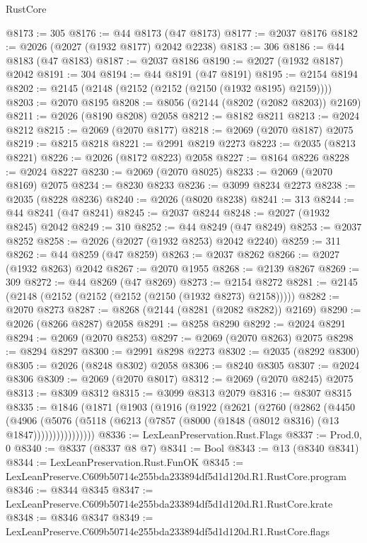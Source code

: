 \begin{lexlean}{RustCore}
\begin{coremodule}
@8173 := 305
@8176 := @44 @8173 (@47 @8173)
@8177 := @2037 @8176
@8182 := @2026 (@2027 (@1932 @8177) @2042 @2238)
@8183 := 306
@8186 := @44 @8183 (@47 @8183)
@8187 := @2037 @8186
@8190 := @2027 (@1932 @8187) @2042
@8191 := 304
@8194 := @44 @8191 (@47 @8191)
@8195 := @2154 @8194
@8202 := @2145 (@2148 (@2152 (@2152 (@2150 (@1932 @8195) @2159))))
@8203 := @2070 @8195
@8208 := @8056 (@2144 (@8202 (@2082 @8203)) @2169)
@8211 := @2026 (@8190 @8208) @2058
@8212 := @8182 @8211
@8213 := @2024 @8212
@8215 := @2069 (@2070 @8177)
@8218 := @2069 (@2070 @8187) @2075
@8219 := @8215 @8218
@8221 := @2991 @8219 @2273
@8223 := @2035 (@8213 @8221)
@8226 := @2026 (@8172 @8223) @2058
@8227 := @8164 @8226
@8228 := @2024 @8227
@8230 := @2069 (@2070 @8025)
@8233 := @2069 (@2070 @8169) @2075
@8234 := @8230 @8233
@8236 := @3099 @8234 @2273
@8238 := @2035 (@8228 @8236)
@8240 := @2026 (@8020 @8238)
@8241 := 313
@8244 := @44 @8241 (@47 @8241)
@8245 := @2037 @8244
@8248 := @2027 (@1932 @8245) @2042
@8249 := 310
@8252 := @44 @8249 (@47 @8249)
@8253 := @2037 @8252
@8258 := @2026 (@2027 (@1932 @8253) @2042 @2240)
@8259 := 311
@8262 := @44 @8259 (@47 @8259)
@8263 := @2037 @8262
@8266 := @2027 (@1932 @8263) @2042
@8267 := @2070 @1955
@8268 := @2139 @8267
@8269 := 309
@8272 := @44 @8269 (@47 @8269)
@8273 := @2154 @8272
@8281 := @2145 (@2148 (@2152 (@2152 (@2152 (@2150 (@1932 @8273) @2158)))))
@8282 := @2070 @8273
@8287 := @8268 (@2144 (@8281 (@2082 @8282)) @2169)
@8290 := @2026 (@8266 @8287) @2058
@8291 := @8258 @8290
@8292 := @2024 @8291
@8294 := @2069 (@2070 @8253)
@8297 := @2069 (@2070 @8263) @2075
@8298 := @8294 @8297
@8300 := @2991 @8298 @2273
@8302 := @2035 (@8292 @8300)
@8305 := @2026 (@8248 @8302) @2058
@8306 := @8240 @8305
@8307 := @2024 @8306
@8309 := @2069 (@2070 @8017)
@8312 := @2069 (@2070 @8245) @2075
@8313 := @8309 @8312
@8315 := @3099 @8313 @2079
@8316 := @8307 @8315
@8335 := @1846
    (@1871
      (@1903
        (@1916
          (@1922
            (@2621
              (@2760
                (@2862
                  (@4450
                    (@4906
                      (@5076
                        (@5118 (@6213 (@7857 (@8000 (@1848 (@8012 @8316) (@13 @1847))))))))))))))))
@8336 := LexLeanPreservation.Rust.Flags
@8337 := Prod.{0, 0}
@8340 := @8337 (@8337 @8 @7)
@8341 := Bool
@8343 := @13 (@8340 @8341)
@8344 := LexLeanPreservation.Rust.FunOK
@8345 := LexLeanPreserve.C609b50714e255bda233894df5d1d120d.R1.RustCore.program
@8346 := @8344 @8345
@8347 := LexLeanPreserve.C609b50714e255bda233894df5d1d120d.R1.RustCore.krate
@8348 := @8346 @8347
@8349 := LexLeanPreserve.C609b50714e255bda233894df5d1d120d.R1.RustCore.flags

\end{coremodule}
\end{lexlean}
